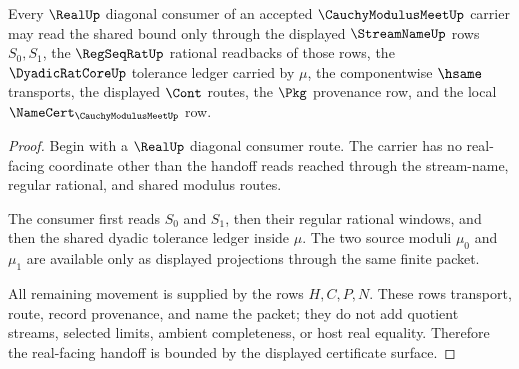 \begin{theorem}\label{thm:cauchy-modulus-meet-real-handoff-boundary}
Every $\RealUp$ diagonal consumer of an accepted $\CauchyModulusMeetUp$ carrier may read the shared bound only through the displayed $\StreamNameUp$ rows $S_0,S_1$, the $\RegSeqRatUp$ rational readbacks of those rows, the $\DyadicRatCoreUp$ tolerance ledger carried by $\mu$, the componentwise $\hsame$ transports, the displayed $\Cont$ routes, the $\Pkg$ provenance row, and the local $\NameCert_{\CauchyModulusMeetUp}$ row.
\end{theorem}
\begin{proof}
Begin with a $\RealUp$ diagonal consumer route. The carrier has no real-facing coordinate other than the handoff reads reached through the stream-name, regular rational, and shared modulus routes.

The consumer first reads $S_0$ and $S_1$, then their regular rational windows, and then the shared dyadic tolerance ledger inside $\mu$. The two source moduli $\mu_0$ and $\mu_1$ are available only as displayed projections through the same finite packet.

All remaining movement is supplied by the rows $H,C,P,N$. These rows transport, route, record provenance, and name the packet; they do not add quotient streams, selected limits, ambient completeness, or host real equality. Therefore the real-facing handoff is bounded by the displayed certificate surface.
\end{proof}

